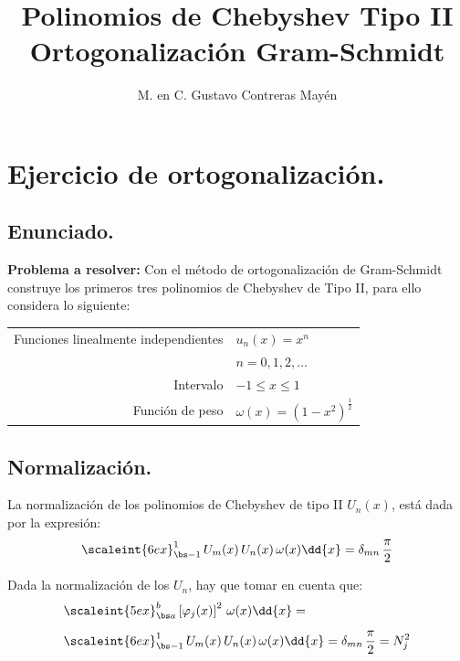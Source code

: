 
\title{Polinomios de Chebyshev Tipo II  \large {Ortogonalización Gram-Schmidt}\vspace{-3ex}}

\author{M. en C. Gustavo Contreras Mayén}
\date{ }

\pagestyle{fancy}
\fancyhf{}
\lhead{\leftmark}
\rfoot{\thepage}
\setlength{\headheight}{16pt}%



\maketitle
\fontsize{14}{14}\selectfont
\tableofcontents
\newpage

\section{Ejercicio de ortogonalización.}
\subsection{Enunciado.}

\textbf{Problema a resolver: } Con el método de ortogonalización de Gram-Schmidt construye los primeros tres polinomios de Chebyshev de Tipo II, para ello considera lo siguiente:
\begin{table}[H]
\begin{tabular}{r l}
Funciones linealmente independientes & $u_{n}(x) = x^{n}$ \\
 & $n = 0, 1, 2, \ldots$  \\
Intervalo & $-1 \leq x \leq 1$ \\  
Función de peso & $\omega (x) = (1 -x^{2})^{\frac{1}{2}}$
\end{tabular}
\end{table}

\subsection{Normalización.}

La normalización de los polinomios de Chebyshev de tipo II $U_{n}(x)$, está dada por la expresión:
\begin{align*}
\scaleint{6ex}_{\bs -1}^{1} \, U_{m}(x) \, U_{n} (x) \, \omega (x) \dd{x} = \delta_{mn} \, \dfrac{\pi}{2}
\end{align*}

Dada la normalización de los $U_{n}$, hay que tomar en cuenta que:
\begin{align*}
&\scaleint{5ex}_{\bs a}^{b} \left[ \varphi_{j} (x) \right]^{2} \, \omega (x) \dd{x} = \\[0.5em] 
&\scaleint{6ex}_{\bs -1}^{1} \, U_{m}(x) \, U_{n} (x) \, \omega (x) \dd{x} = \delta_{mn} \, \dfrac{\pi}{2} =  N_{j}^{2}
\end{align*}

